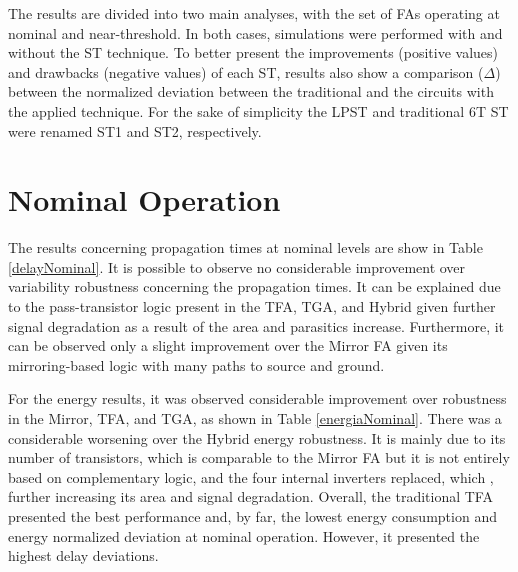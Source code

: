 \documentclass[pgmicro,diss,english]{iiufrgs}
\begin{document}
The results are divided into two main analyses, with the set of FAs operating at nominal and near-threshold. In both cases, simulations were performed with and without the ST technique. To better present the improvements (positive values) and drawbacks (negative values) of each ST, results also show a comparison ($\Delta$) between the normalized deviation between the traditional and the circuits with the applied technique. For the sake of simplicity the LPST and traditional 6T ST were renamed ST1 and ST2, respectively.

\section{Nominal Operation}

The results concerning propagation times at nominal levels are show in Table \ref{delayNominal}. It is possible to observe no considerable improvement over variability robustness concerning the propagation times. It can be explained due to the pass-transistor logic present in the TFA, TGA, and Hybrid given further signal degradation as a result of the area and parasitics increase. Furthermore, it can be observed only a slight improvement over the Mirror FA given its mirroring-based logic with many paths to source and ground.

For the energy results, it was observed considerable improvement over robustness in the Mirror, TFA, and TGA, as shown in Table \ref{energiaNominal}. There was a considerable worsening over the Hybrid energy robustness. It is mainly due to its number of transistors, which is comparable to the Mirror FA but it is not entirely based on complementary logic, and the four internal inverters replaced, which , further increasing its area and signal degradation. Overall, the traditional TFA presented the best performance and, by far, the lowest energy consumption and energy normalized deviation at nominal operation. However, it presented the highest delay deviations.

\end{document}

